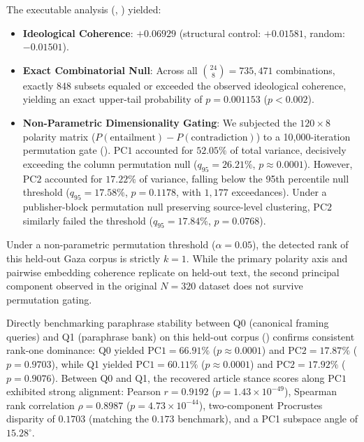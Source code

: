 The executable analysis (, ) yielded:
\begin{itemize}
    \item \textbf{Ideological Coherence}: $+0.06929$ (structural control: $+0.01581$, random: $-0.01501$).
    \item \textbf{Exact Combinatorial Null}: Across all $\binom{24}{8} = 735{,}471$ combinations, exactly 848 subsets equaled or exceeded the observed ideological coherence, yielding an exact upper-tail probability of $p = 0.001153$ ($p < 0.002$).
    \item \textbf{Non-Parametric Dimensionality Gating}: We subjected the $120 \times 8$ polarity matrix ($P(\text{entailment}) - P(\text{contradiction})$) to a 10,000-iteration permutation gate (). $\mathrm{PC1}$ accounted for $52.05\%$ of total variance, decisively exceeding the column permutation null ($q_{95} = 26.21\%$, $p \approx 0.0001$). However, $\mathrm{PC2}$ accounted for $17.22\%$ of variance, falling below the 95th percentile null threshold ($q_{95} = 17.58\%$, $p = 0.1178$, with $1{,}177$ exceedances). Under a publisher-block permutation null preserving source-level clustering, $\mathrm{PC2}$ similarly failed the threshold ($q_{95} = 17.84\%$, $p = 0.0768$).
\end{itemize}
Under a non-parametric permutation threshold ($\alpha = 0.05$), the detected rank of this held-out Gaza corpus is strictly $k=1$. While the primary polarity axis and pairwise embedding coherence replicate on held-out text, the second principal component observed in the original $N=320$ dataset does not survive permutation gating.

Directly benchmarking paraphrase stability between Q0 (canonical framing queries) and Q1 (paraphrase bank) on this held-out corpus () confirms consistent rank-one dominance: Q0 yielded $\mathrm{PC1} = 66.91\%$ ($p \approx 0.0001$) and $\mathrm{PC2} = 17.87\%$ ($p = 0.9703$), while Q1 yielded $\mathrm{PC1} = 60.11\%$ ($p \approx 0.0001$) and $\mathrm{PC2} = 17.92\%$ ($p = 0.9076$). Between Q0 and Q1, the recovered article stance scores along $\mathrm{PC1}$ exhibited strong alignment: Pearson $r = 0.9192$ ($p = 1.43 \times 10^{-49}$), Spearman rank correlation $\rho = 0.8987$ ($p = 4.73 \times 10^{-44}$), two-component Procrustes disparity of $0.1703$ (matching the $0.173$ benchmark), and a PC1 subspace angle of $15.28^\circ$.

